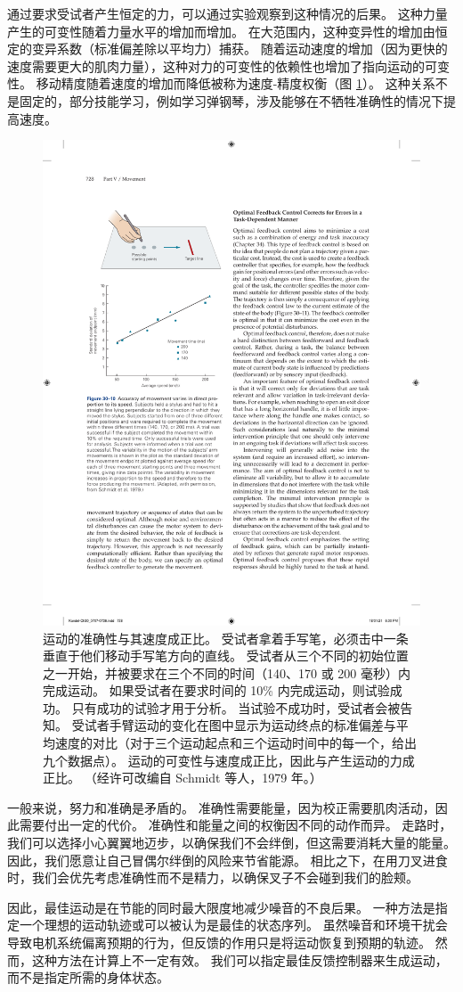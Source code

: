 通过要求受试者产生恒定的力，可以通过实验观察到这种情况的后果。
这种力量产生的可变性随着力量水平的增加而增加。
在大范围内，这种变异性的增加由恒定的变异系数（标准偏差除以平均力）捕获。
随着运动速度的增加（因为更快的速度需要更大的肌肉力量），这种对力的可变性的依赖性也增加了指向运动的可变性。
移动精度随着速度的增加而降低被称为速度-精度权衡（图 \ref{fig:30_10}）。
这种关系不是固定的，部分技能学习，例如学习弹钢琴，涉及能够在不牺牲准确性的情况下提高速度。


\begin{figure}[htbp]
	\centering
	\includegraphics[width=0.5\linewidth]{chap30/fig_30_10}
	\caption{运动的准确性与其速度成正比。 受试者拿着手写笔，必须击中一条垂直于他们移动手写笔方向的直线。 受试者从三个不同的初始位置之一开始，并被要求在三个不同的时间（140、170 或 200 毫秒）内完成运动。 如果受试者在要求时间的 10\% 内完成运动，则试验成功。 只有成功的试验才用于分析。 当试验不成功时，受试者会被告知。 受试者手臂运动的变化在图中显示为运动终点的标准偏差与平均速度的对比（对于三个运动起点和三个运动时间中的每一个，给出九个数据点）。 运动的可变性与速度成正比，因此与产生运动的力成正比。 （经许可改编自 Schmidt 等人，1979 年。）}
	\label{fig:30_10}
\end{figure}

一般来说，努力和准确是矛盾的。
准确性需要能量，因为校正需要肌肉活动，因此需要付出一定的代价。
准确性和能量之间的权衡因不同的动作而异。
走路时，我们可以选择小心翼翼地迈步，以确保我们不会绊倒，但这需要消耗大量的能量。
因此，我们愿意让自己冒偶尔绊倒的风险来节省能源。
相比之下，在用刀叉进食时，我们会优先考虑准确性而不是精力，以确保叉子不会碰到我们的脸颊。


因此，最佳运动是在节能的同时最大限度地减少噪音的不良后果。
一种方法是指定一个理想的运动轨迹或可以被认为是最佳的状态序列。
虽然噪音和环境干扰会导致电机系统偏离预期的行为，但反馈的作用只是将运动恢复到预期的轨迹。
然而，这种方法在计算上不一定有效。
我们可以指定最佳反馈控制器来生成运动，而不是指定所需的身体状态。




